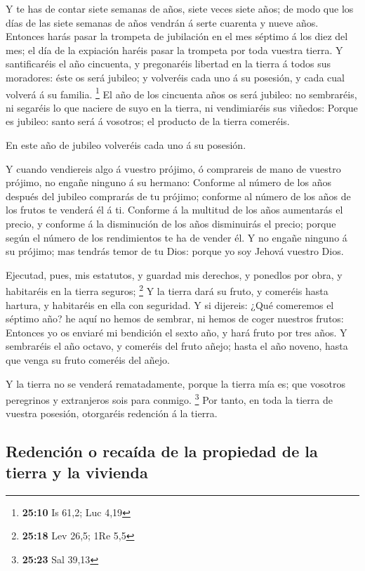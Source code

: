  Y te has de contar siete semanas de años, siete veces siete
años; de modo que los días de las siete semanas de años vendrán á serte
cuarenta y nueve años.  Entonces harás pasar la trompeta de
jubilación en el mes séptimo á los diez del mes; el día de la expiación
haréis pasar la trompeta por toda vuestra tierra.  Y
santificaréis el año cincuenta, y pregonaréis libertad en la tierra á
todos sus moradores: éste os será jubileo; y volveréis cada uno á su
posesión, y cada cual volverá á su familia. \footnote{\textbf{25:10} Is
  61,2; Luc 4,19}  El año de los cincuenta años os será
jubileo: no sembraréis, ni segaréis lo que naciere de suyo en la tierra,
ni vendimiaréis sus viñedos:  Porque es jubileo: santo será
á vosotros; el producto de la tierra comeréis.

 En este año de jubileo volveréis cada uno á su posesión.

 Y cuando vendiereis algo á vuestro prójimo, ó comprareis
de mano de vuestro prójimo, no engañe ninguno á su hermano:
 Conforme al número de los años después del jubileo
comprarás de tu prójimo; conforme al número de los años de los frutos te
venderá él á ti.  Conforme á la multitud de los años
aumentarás el precio, y conforme á la disminución de los años
disminuirás el precio; porque según el número de los rendimientos te ha
de vender él.  Y no engañe ninguno á su prójimo; mas
tendrás temor de tu Dios: porque yo soy Jehová vuestro Dios.

 Ejecutad, pues, mis estatutos, y guardad mis derechos, y
ponedlos por obra, y habitaréis en la tierra seguros; \footnote{\textbf{25:18}
  Lev 26,5; 1Re 5,5}  Y la tierra dará su fruto, y comeréis
hasta hartura, y habitaréis en ella con seguridad.  Y si
dijereis: ¿Qué comeremos el séptimo año? he aquí no hemos de sembrar, ni
hemos de coger nuestros frutos:  Entonces yo os enviaré mi
bendición el sexto año, y hará fruto por tres años.  Y
sembraréis el año octavo, y comeréis del fruto añejo; hasta el año
noveno, hasta que venga su fruto comeréis del añejo.

 Y la tierra no se venderá rematadamente, porque la tierra
mía es; que vosotros peregrinos y extranjeros sois para conmigo.
\footnote{\textbf{25:23} Sal 39,13}  Por tanto, en toda la
tierra de vuestra posesión, otorgaréis redención á la tierra.

\hypertarget{redenciuxf3n-o-recauxedda-de-la-propiedad-de-la-tierra-y-la-vivienda}{%
\subsection{Redención o recaída de la propiedad de la tierra y la
vivienda}\label{redenciuxf3n-o-recauxedda-de-la-propiedad-de-la-tierra-y-la-vivienda}}


